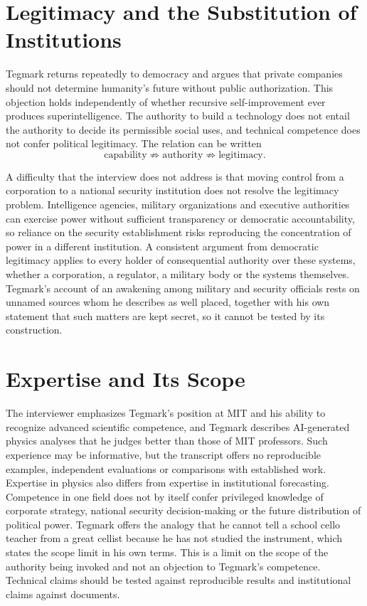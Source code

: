 \documentclass[11pt]{article}
\begin{document}
\section{Legitimacy and the Substitution of Institutions}

Tegmark returns repeatedly to democracy and argues that private companies should not determine humanity's future without public authorization. This objection holds independently of whether recursive self-improvement ever produces superintelligence. The authority to build a technology does not entail the authority to decide its permissible social uses, and technical competence does not confer political legitimacy. The relation can be written
\[
\text{capability} \not\Rightarrow \text{authority} \not\Rightarrow \text{legitimacy}.
\]

A difficulty that the interview does not address is that moving control from a corporation to a national security institution does not resolve the legitimacy problem. Intelligence agencies, military organizations and executive authorities can exercise power without sufficient transparency or democratic accountability, so reliance on the security establishment risks reproducing the concentration of power in a different institution. A consistent argument from democratic legitimacy applies to every holder of consequential authority over these systems, whether a corporation, a regulator, a military body or the systems themselves. Tegmark's account of an awakening among military and security officials rests on unnamed sources whom he describes as well placed, together with his own statement that such matters are kept secret, so it cannot be tested by its construction.

\section{Expertise and Its Scope}

The interviewer emphasizes Tegmark's position at MIT and his ability to recognize advanced scientific competence, and Tegmark describes AI-generated physics analyses that he judges better than those of MIT professors. Such experience may be informative, but the transcript offers no reproducible examples, independent evaluations or comparisons with established work. Expertise in physics also differs from expertise in institutional forecasting. Competence in one field does not by itself confer privileged knowledge of corporate strategy, national security decision-making or the future distribution of political power. Tegmark offers the analogy that he cannot tell a school cello teacher from a great cellist because he has not studied the instrument, which states the scope limit in his own terms. This is a limit on the scope of the authority being invoked and not an objection to Tegmark's competence. Technical claims should be tested against reproducible results and institutional claims against documents.
\end{document}
